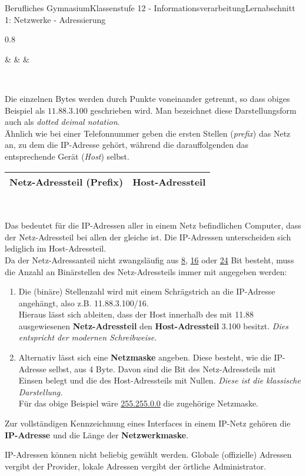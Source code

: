\documentclass[11pt,oneside,openany,headings=optiontotoc,11pt,numbers=noenddot]{article}
\begin{document}
\begin{worksheet}{Berufliches Gymnasium}{Klassenstufe 12 - Informationsverarbeitung}{Lernabschnitt 1: Netzwerke - Adressierung}
\begin{tabularx}{0.8\textwidth}
			 &  &  & \\
		\end{tabularx}\\
		\par\noindent
		Die einzelnen Bytes werden durch Punkte voneinander getrennt, so dass obiges Beispiel als \(\mathbf{11.88.3.100}\) geschrieben wird. Man bezeichnet diese Darstellungsform auch als \textit{dotted deimal notation}.\\
		Ähnlich wie bei einer Telefonnummer geben die ersten Stellen (\textit{prefix}) das Netz an, zu dem die IP-Adresse gehört, während die darauffolgenden das entsprechende Gerät (\textit{Host}) selbst.\\
		\par\noindent
		\begin{tabularx}{\textwidth}{|M|M|}
			\hline
			 Netz-Adressteil (Prefix) & Host-Adressteil\\
			\hline
		\end{tabularx}\\
		\par\noindent
		Das bedeutet für die IP-Adressen aller in einem Netz befindlichen Computer, dass der Netz-Adressteil bei allen der gleiche ist. Die IP-Adressen unterscheiden sich lediglich im Host-Adressteil.\\
		Da der Netz-Adressanteil nicht zwangsläufig aus \underline{8}, \underline{16} oder \underline{24} Bit besteht, muss die Anzahl an Binärstellen des Netz-Adressteils immer mit angegeben werden:
		\begin{enumerate}
			\item Die (binäre) Stellenzahl wird mit einem Schrägstrich an die IP-Adresse angehängt, also z.B. 11.88.3.100/16.\\
			Hieraus lässt sich ableiten, dass der Host innerhalb des mit 11.88 ausgewiesenen \textbf{Netz-Adressteil} den \textbf{Host-Adressteil} 3.100 besitzt. \textit{Dies entspricht der modernen Schreibweise.}
			\item Alternativ lässt sich eine \textbf{Netzmaske} angeben. Diese besteht, wie die IP-Adresse selbst, aus 4 Byte. Davon sind die Bit des Netz-Adressteils mit Einsen belegt und die des Host-Adressteils mit Nullen. \textit{Diese ist die klassische Darstellung.}\\
			Für das obige Beispiel wäre \underline{255.255.0.0} die zugehörige Netzmaske.
		\end{enumerate}
		\begin{framed}
			\noindent
			Zur vollständigen Kennzeichnung eines Interfaces in einem IP-Netz gehören die \textbf{IP-Adresse} und die Länge der \textbf{Netzwerkmaske}.\\
			\par\noindent
			IP-Adressen können nicht beliebig gewählt werden. Globale (offizielle) Adressen vergibt der Provider, lokale Adressen vergibt der örtliche Administrator.
		\end{framed}

\end{worksheet}
\end{document}
